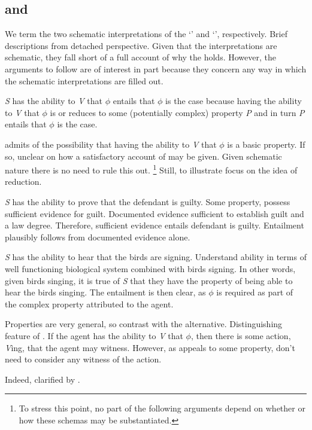 \subsection{\AR{} and \WR{}}
\label{sec:ar-wr-1}

\begin{note}[\WR{} and \AR{}]
  We term the two schematic interpretations of the \aben{} `\AR{}' and `\WR{}', respectively.
  Brief descriptions from detached perspective.
  Given that the interpretations are schematic, they fall short of a full account of why the \aben{} holds.
  However, the arguments to follow are of interest in part because they concern any way in which the schematic interpretations are filled out.
\end{note}

\begin{note}
  \begin{definition}[\AR{}]\label{A:s}
    \emph{S} has the ability to \emph{V} that \(\phi\) entails that \(\phi\) is the case because having the ability to \emph{V} that \(\phi\) is or reduces to some (potentially complex) property \emph{P} and in turn \emph{P} entails that \(\phi\) is the case.
  \end{definition}

  \AR{} admits of the possibility that having the ability to \emph{V} that \(\phi\) is a basic property.
  If so, unclear on how a satisfactory account of \aben{} may be given.
  Given schematic nature there is no need to rule this out.\nolinebreak
  \footnote{
    To stress this point, no part of the following arguments depend on whether or how these schemas may be substantiated.
  }
  Still, to illustrate focus on the idea of reduction.

  \emph{S} has the ability to prove that the defendant is guilty.
  Some property, possess sufficient evidence for guilt.
  Documented evidence sufficient to establish guilt and a law degree.
  Therefore, sufficient evidence entails defendant is guilty.
  Entailment plausibly follows from documented evidence alone.

  \emph{S} has the ability to hear that the birds are signing.
  Understand ability in terms of well functioning biological system combined with birds signing.
  In other words, given birds singing, it is true of \emph{S} that they have the property of being able to hear the birds singing.
  The entailment is then clear, as \(\phi\) is required as part of the complex property attributed to the agent.

  Properties are very general, so contrast with the alternative.
  Distinguishing feature of \AR{}.
  If the agent has the ability to \emph{V} that \(\phi\), then there is some action, \emph{V}ing, that the agent may witness.
  However, as \AR{} appeals to some property, don't need to consider any witness of the action.

  Indeed, clarified by \WR{}.
\end{note}

